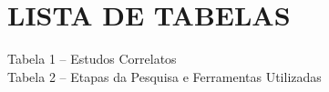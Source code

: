 
\chapter*{LISTA DE TABELAS}

\vspace{1cm}

\noindent
Tabela 1 -- Estudos Correlatos \\
Tabela 2 -- Etapas da Pesquisa e Ferramentas Utilizadas 

